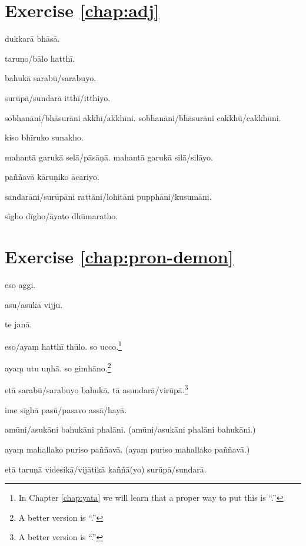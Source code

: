 \section*{Exercise \ref{chap:adj}}
\begin{answerkey}
\item dukkar\=a bh\=as\=a.
\item taru\d no/b\=alo hatth\=i.
\item bahuk\=a sarab\=u/sarabuyo.
\item sur\=up\=a/sundar\=a itth\=i/itthiyo.
\item sobhan\=ani/bh\=asur\=ani akkh\=i/akkh\=ini. sobhan\=ani/bh\=asur\=ani cakkh\=u/cakkh\=uni.
\item kiso bh\=iruko sunakho.
\item mahant\=a garuk\=a sel\=a/p\=as\=a\d n\=a. mahant\=a garuk\=a sil\=a/sil\=ayo.
\item pa\~n\~nav\=a k\=aru\d niko \=acariyo.
\item sandar\=ani/sur\=up\=ani ratt\=ani/lohit\=ani pupph\=ani/kusum\=ani.
\item s\=igho d\=igho/\=ayato dh\=umaratho.
\end{answerkey}

\section*{Exercise \ref{chap:pron-demon}}
\begin{answerkey}
\item eso aggi.
\item asu/asuk\=a vijju.
\item te jan\=a.
\item eso/aya\d m hatth\=i th\=ulo. so ucco.\footnote{In Chapter \ref{chap:yata} we will learn that a proper way to put this is ``.''}
\item aya\d m utu u\d nh\=a. so gimh\=ano.\footnote{A better version is ``.''}
\item et\=a sarab\=u/sarabuyo bahuk\=a. t\=a asundar\=a/vir\=up\=a.\footnote{A better version is ``.''}
\item ime s\=igh\=a pas\=u/pasavo ass\=a/hay\=a.
\item am\=uni/asuk\=ani bahuk\=ani phal\=ani. (am\=uni/asuk\=ani phal\=ani bahuk\=ani.)
\item aya\d m mahallako puriso pa\~n\~nav\=a. (aya\d m puriso mahallako pa\~n\~nav\=a.)
\item et\=a taru\d n\=a videsik\=a/vij\=atik\=a ka\~n\~n\=a(yo) sur\=up\=a/sundar\=a.
\end{answerkey}

